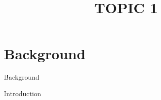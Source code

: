 \documentclass{beamer}
\title{TOPIC 1}
\begin{document}
\begin{frame}
\titlepage
\end{frame}

\section{Background}
\begin{frame}{Background}

{\small

Introduction


}

\end{frame}
\end{document}
